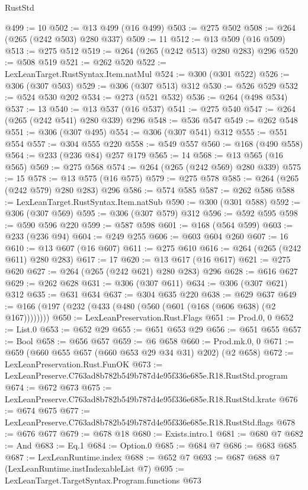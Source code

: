 \begin{lexlean}{RustStd}
\begin{coremodule}
@499 := 10
@502 := @13 @499 (@16 @499)
@503 := @275 @502
@508 := @264 (@265 (@242 @503) @280 @337)
@509 := 11
@512 := @13 @509 (@16 @509)
@513 := @275 @512
@519 := @264 (@265 (@242 @513) @280 @283) @296
@520 := @508 @519
@521 := @262 @520
@522 := LexLeanTarget.RustSyntax.Item.natMul
@524 := @300 (@301 @522)
@526 := @306 (@307 @503)
@529 := @306 (@307 @513) @312
@530 := @526 @529
@532 := @524 @530 @202
@534 := @273 (@521 @532)
@536 := @264 (@498 @534)
@537 := 13
@540 := @13 @537 (@16 @537)
@541 := @275 @540
@547 := @264 (@265 (@242 @541) @280 @339) @296
@548 := @536 @547
@549 := @262 @548
@551 := @306 (@307 @495)
@554 := @306 (@307 @541) @312
@555 := @551 @554
@557 := @304 @555 @220
@558 := @549 @557
@560 := @168 (@490 @558)
@564 := @233 (@236 @84) @257 @179
@565 := 14
@568 := @13 @565 (@16 @565)
@569 := @275 @568
@574 := @264 (@265 (@242 @569) @280 @339)
@575 := 15
@578 := @13 @575 (@16 @575)
@579 := @275 @578
@585 := @264 (@265 (@242 @579) @280 @283) @296
@586 := @574 @585
@587 := @262 @586
@588 := LexLeanTarget.RustSyntax.Item.natSub
@590 := @300 (@301 @588)
@592 := @306 (@307 @569)
@595 := @306 (@307 @579) @312
@596 := @592 @595
@598 := @590 @596 @220
@599 := @587 @598
@601 := @168 (@564 @599)
@603 := @233 (@236 @94)
@604 := @249 @255
@606 := @603 @604 @260
@607 := 16
@610 := @13 @607 (@16 @607)
@611 := @275 @610
@616 := @264 (@265 (@242 @611) @280 @283)
@617 := 17
@620 := @13 @617 (@16 @617)
@621 := @275 @620
@627 := @264 (@265 (@242 @621) @280 @283) @296
@628 := @616 @627
@629 := @262 @628
@631 := @306 (@307 @611)
@634 := @306 (@307 @621) @312
@635 := @631 @634
@637 := @304 @635 @220
@638 := @629 @637
@649 := @166 (@197 (@232 (@433 (@480 (@560 (@601 (@168 (@606 @638) (@2 @167))))))))
@650 := LexLeanPreservation.Rust.Flags
@651 := Prod.{0, 0}
@652 := List.{0}
@653 := @652 @29
@655 := @651 @653 @29
@656 := @651 @655
@657 := Bool
@658 := @656 @657
@659 := @6 @658
@660 := Prod.mk.{0, 0}
@671 := @659 (@660 @655 @657 (@660 @653 @29 @34 @31) @202) (@2 @658)
@672 := LexLeanPreservation.Rust.FunOK
@673 := LexLeanPreserve.C763ad8b782b549b787d4e95f336e685e.R18.RustStd.program
@674 := @672 @673
@675 := LexLeanPreserve.C763ad8b782b549b787d4e95f336e685e.R18.RustStd.krate
@676 := @674 @675
@677 := LexLeanPreserve.C763ad8b782b549b787d4e95f336e685e.R18.RustStd.flags
@678 := @676 @677
@679 := @678 @18
@680 := Exists.intro.{1}
@681 := @680 @7
@682 := And
@683 := Eq.{1}
@684 := Option.{0}
@685 := @684 @7
@686 := @683 @685
@687 := LexLeanRuntime.index
@688 := @652 @7
@693 := @687 @688 @7 (LexLeanRuntime.instIndexableList @7)
@695 := LexLeanTarget.TargetSyntax.Program.functions @673

\end{coremodule}
\end{lexlean}
